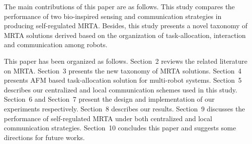 \documentclass[journal]{IEEEtran}
\begin{document}
The main contributions of this paper are as follows.
This study compares the performance of two bio-inspired sensing and communication strategies in producing self-regulated MRTA.
Besides, this study presents a novel taxonomy of MRTA solutions  derived based on the organization of task-allocation, interaction and communication among robots.

This paper has been organized as follows.
Section~2 reviews the related literature on MRTA.
Section~3 presents the new taxonomy of MRTA solutions.
Section~4 presents AFM based task-allocation solution for multi-robot systems. 
Section~5  describes our centralized and local communication schemes used in this study.
Section~6 and Section~7 present the design and implementation of our experiments respectively.
Section~8 describes our results. 
Section~9 discusses the performance of self-regulated MRTA under both centralized and local communication strategies.
Section~10 concludes this paper and suggests some directions for future works.
\end{document}
